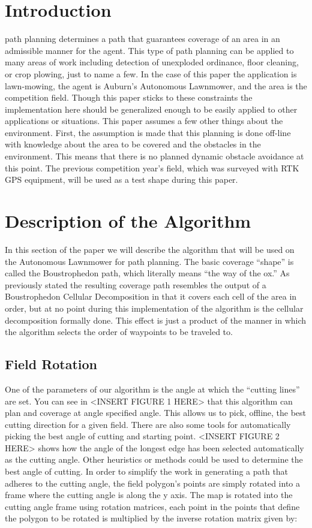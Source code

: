 \documentclass[journal]{IEEEtran}
\begin{document}
  \section{Introduction}
   path planning determines a path that guarantees coverage of an area in an admissible manner for the agent.  This type of path planning can be applied to many areas of work including detection of unexploded ordinance, floor cleaning, or crop plowing, just to name a few. In the case of this paper the application is lawn-mowing, the agent is Auburn's Autonomous Lawnmower, and the area is the competition field.  Though this paper sticks to these constraints the implementation here should be generalized enough to be easily applied to other applications or situations.  This paper assumes a few other things about the environment.  First, the assumption is made that this planning is done off-line with knowledge about the area to be covered and the obstacles in the environment.  This means that there is no planned dynamic obstacle avoidance at this point.  The previous competition year's field, which was surveyed with RTK GPS equipment, will be used as a test shape during this paper.
  
  \section{Description of the Algorithm}
  In this section of the paper we will describe the algorithm that will be used on the Autonomous Lawnmower for path planning.  The basic coverage ``shape'' is called the Boustrophedon path, which literally means ``the way of the ox.''\cite{Choset_1997_1416}  As previously stated the resulting coverage path resembles the output of a Boustrophedon Cellular Decomposition in that it covers each cell of the area in order, but at no point during this implementation of the algorithm is the cellular decomposition formally done.  This effect is just a product of the manner in which the algorithm selects the order of waypoints to be traveled to.
  
  \subsection{Field Rotation}
  One of the parameters of our algorithm is the angle at which the ``cutting lines'' are set.  You can see in <INSERT FIGURE 1 HERE> that this algorithm can plan and coverage at angle specified angle.  This allows us to pick, offline, the best cutting direction for a given field.  There are also some tools for automatically picking the best angle of cutting and starting point.  <INSERT FIGURE 2 HERE> shows how the angle of the longest edge has been selected automatically as the cutting angle.  Other heuristics or methods could be used to determine the best angle of cutting.  In order to simplify the work in generating a path that adheres to the cutting angle, the field polygon's points are simply rotated into a frame where the cutting angle is along the y axis.  The map is rotated into the cutting angle frame using rotation matrices\cite[p.60]{siegwart2004introduction}, each point in the points that define the polygon to be rotated is multiplied by the inverse rotation matrix given by:
  
\end{document}
